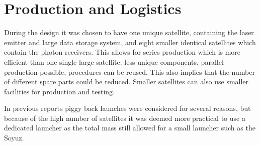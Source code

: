 \section{Production and Logistics}
\label{SSPRO}

During the design it was chosen to have one unique satellite, containing the laser emitter and large data storage system, and eight smaller identical satellites which contain the photon receivers. This allows for series production which is more efficient than one single large satellite: less unique components, parallel production possible, procedures can be reused. This also implies that the number of different spare parts could be reduced. Smaller satellites can also use smaller facilities for production and testing. 

In previous reports piggy back launches were considered for several reasons, but because of the high number of satellites it was deemed more practical to use a dedicated launcher as the total mass still allowed for a small launcher such as the Soyuz.
